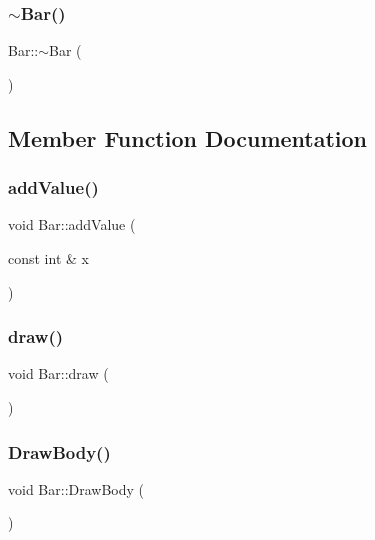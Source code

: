 \mbox{\label{class_bar_a9c7ebea0c189423591741ac438985316}} 
\subsubsection{\texorpdfstring{$\sim$\+Bar()}{~Bar()}}
{\footnotesize\ttfamily Bar\+::$\sim$\+Bar (\begin{DoxyParamCaption}{ }\end{DoxyParamCaption})}



\subsection{Member Function Documentation}
\mbox{\label{class_bar_a24a08c0c5d9c69b8c66abd3a93d0f709}} 
\subsubsection{\texorpdfstring{add\+Value()}{addValue()}}
{\footnotesize\ttfamily void Bar\+::add\+Value (\begin{DoxyParamCaption}\item[{const int \&}]{x }\end{DoxyParamCaption})\hspace{0.3cm}{\ttfamily [inline]}}

\mbox{\label{class_bar_aeb2be7aa59cc5475899800d2ce7bfbf7}} 
\subsubsection{\texorpdfstring{draw()}{draw()}}
{\footnotesize\ttfamily void Bar\+::draw (\begin{DoxyParamCaption}{ }\end{DoxyParamCaption})}

\mbox{\label{class_bar_aeeee51e9cd348b8d047d8471b6cd4a4f}} 
\subsubsection{\texorpdfstring{Draw\+Body()}{DrawBody()}}
{\footnotesize\ttfamily void Bar\+::\+Draw\+Body (\begin{DoxyParamCaption}{ }\end{DoxyParamCaption})\hspace{0.3cm}{\ttfamily [private]}}

